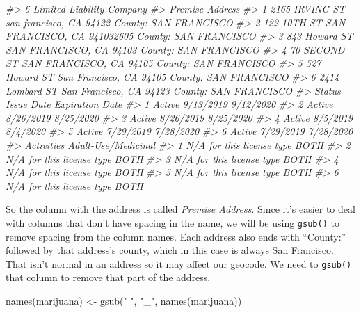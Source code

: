 \documentclass[
]{krantz}
\makeatletter
\newenvironment{Shaded}{\begin{snugshade}}{\end{snugshade}}
\newcommand{\CommentTok}[1]{\textcolor[rgb]{0.37,0.37,0.37}{\textit{#1}}}
\newcommand{\FunctionTok}[1]{\textcolor[rgb]{0,0,0}{#1}}
\newcommand{\NormalTok}[1]{#1}
\newcommand{\OtherTok}[1]{\textcolor[rgb]{0.37,0.37,0.37}{#1}}
\newcommand{\StringTok}[1]{\textcolor[rgb]{0.5,0.5,0.5}{#1}}
\newenvironment{kframe}{%
\medskip{}
\setlength{\fboxsep}{.8em}
 \def\at@end@of@kframe{}%
 \ifinner\ifhmode%
  \def\at@end@of@kframe{\end{minipage}}%
  \begin{minipage}{\columnwidth}%
 \fi\fi%
 \def\FrameCommand##1{\hskip\@totalleftmargin \hskip-\fboxsep
 \colorbox{shadecolor}{##1}\hskip-\fboxsep
     \hskip-\linewidth \hskip-\@totalleftmargin \hskip\columnwidth}%
 \MakeFramed {\advance\hsize-\width
   \@totalleftmargin\z@ \linewidth\hsize
   \@setminipage}}%
 {\par\unskip\endMakeFramed%
 \at@end@of@kframe}
\renewenvironment{Shaded}{\begin{kframe}}{\end{kframe}}
\makeatother
\begin{document}
\begin{Shaded}
\begin{Highlighting}[]
\CommentTok{\#\textgreater{} 6 Limited Liability Company}
\CommentTok{\#\textgreater{}                                                 Premise Address}
\CommentTok{\#\textgreater{} 1  2165 IRVING ST san francisco, CA 94122 County: SAN FRANCISCO}
\CommentTok{\#\textgreater{} 2 122 10TH ST SAN FRANCISCO, CA 941032605 County: SAN FRANCISCO}
\CommentTok{\#\textgreater{} 3   843 Howard ST SAN FRANCISCO, CA 94103 County: SAN FRANCISCO}
\CommentTok{\#\textgreater{} 4    70 SECOND ST SAN FRANCISCO, CA 94105 County: SAN FRANCISCO}
\CommentTok{\#\textgreater{} 5   527 Howard ST San Francisco, CA 94105 County: SAN FRANCISCO}
\CommentTok{\#\textgreater{} 6 2414 Lombard ST San Francisco, CA 94123 County: SAN FRANCISCO}
\CommentTok{\#\textgreater{}   Status Issue Date Expiration Date}
\CommentTok{\#\textgreater{} 1 Active  9/13/2019       9/12/2020}
\CommentTok{\#\textgreater{} 2 Active  8/26/2019       8/25/2020}
\CommentTok{\#\textgreater{} 3 Active  8/26/2019       8/25/2020}
\CommentTok{\#\textgreater{} 4 Active   8/5/2019        8/4/2020}
\CommentTok{\#\textgreater{} 5 Active  7/29/2019       7/28/2020}
\CommentTok{\#\textgreater{} 6 Active  7/29/2019       7/28/2020}
\CommentTok{\#\textgreater{}                  Activities Adult{-}Use/Medicinal}
\CommentTok{\#\textgreater{} 1 N/A for this license type                BOTH}
\CommentTok{\#\textgreater{} 2 N/A for this license type                BOTH}
\CommentTok{\#\textgreater{} 3 N/A for this license type                BOTH}
\CommentTok{\#\textgreater{} 4 N/A for this license type                BOTH}
\CommentTok{\#\textgreater{} 5 N/A for this license type                BOTH}
\CommentTok{\#\textgreater{} 6 N/A for this license type                BOTH}
\end{Highlighting}
\end{Shaded}

So the column with the address is called \emph{Premise Address}. Since it's easier to deal with columns that don't have spacing in the name, we will be using \texttt{gsub()} to remove spacing from the column names. Each address also ends with ``County:'' followed by that address's county, which in this case is always San Francisco. That isn't normal in an address so it may affect our geocode. We need to \texttt{gsub()} that column to remove that part of the address.

\begin{Shaded}
\begin{Highlighting}[]
\FunctionTok{names}\NormalTok{(marijuana) }\OtherTok{\textless{}{-}} \FunctionTok{gsub}\NormalTok{(}\StringTok{" "}\NormalTok{, }\StringTok{"\_"}\NormalTok{, }\FunctionTok{names}\NormalTok{(marijuana))}
\end{Highlighting}
\end{Shaded}
\end{document}
